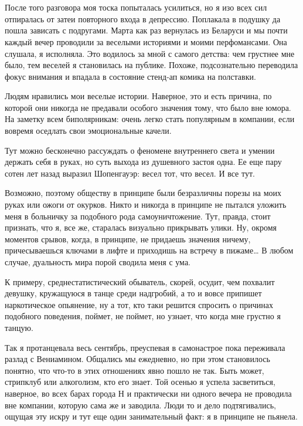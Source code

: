 \documentclass[
]{book}
\begin{document}
\hypertarget{chapter-78}{%
\chapter{~}\label{chapter-78}}

После того разговора моя тоска попыталась усилиться, но я изо всех сил отпиралась от затеи повторного входа в депрессию. Поплакала в подушку да пошла зависать с подругами. Марта как раз вернулась из Беларуси и мы почти каждый вечер проводили за веселыми историями и моими перфомансами. Она слушала, я исполняла. Это водилось за мной с самого детства: чем грустнее мне было, тем веселей я становилась на публике. Похоже, подсознательно переводила фокус внимания и впадала в состояние стенд-ап комика на полставки.

Людям нравились мои веселые истории. Наверное, это и есть причина, по которой они никогда не предавали особого значения тому, что было вне юмора. На заметку всем биполярникам: очень легко стать популярным в компании, если вовремя оседлать свои эмоциональные качели.

Тут можно бесконечно рассуждать о феномене внутреннего света и умении держать себя в руках, но суть выхода из душевного застоя одна. Ее еще пару сотен лет назад выразил Шопенгауэр: весел тот, что весел. И все тут.

Возможно, поэтому обществу в принципе были безразличны порезы на моих руках или ожоги от окурков. Никто и никогда в принципе не пытался уложить меня в больничку за подобного рода самоуничтожение. Тут, правда, стоит признать, что я, все же, старалась визуально прикрывать улики. Ну, окромя моментов срывов, когда, в принципе, не придаешь значения ничему, причесываешься ключами в лифте и приходишь на встречу в пижаме\ldots{} В любом случае, дуальность мира порой сводила меня с ума.

К примеру, среднестатистический обыватель, скорей, осудит, чем похвалит девушку, кружащуюся в танце среди надгробий, а то и вовсе припишет наркотическое опьянение, ну а тот, кто таки решится спросить о причинах подобного поведения, поймет, не поймет, но узнает, что когда мне грустно я танцую.

Так я протанцевала весь сентябрь, преуспевая в самонастрое пока переживала разлад с Вениамином. Общались мы ежедневно, но при этом становилось понятно, что что-то в этих отношениях явно пошло не так. Быть может, стрипклуб или алкоголизм, кто его знает. Той осенью я успела засветиться, наверное, во всех барах города Н и практически ни одного вечера не проводила вне компании, которую сама же и заводила. Люди то и дело подтягивались, ощущая эту искру и тут еще один занимательный факт: я в принципе не пьянела.
\end{document}
